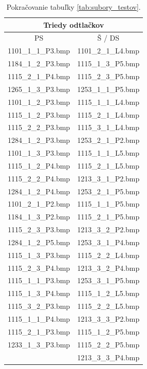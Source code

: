   \begin{table}
    \centering
    \caption{Pokračovanie tabuľky \ref{tab:subory_testov}.}
    \begin{tabular}{ | c | c | }
      \hline
      \multicolumn{2}{|c|}{Triedy odtlačkov}            \\
      \hline
      PS    & Š / DS     \\
      \hline
       1101\_1\_1\_P3.bmp & 1101\_2\_1\_L4.bmp \\
       1184\_1\_2\_P3.bmp & 1115\_1\_3\_P5.bmp \\
       1115\_2\_1\_P4.bmp & 1115\_2\_3\_P5.bmp \\
       1265\_1\_3\_P3.bmp & 1253\_1\_1\_P5.bmp \\
       1101\_1\_2\_P3.bmp & 1115\_1\_1\_L4.bmp \\
       1115\_1\_2\_P3.bmp & 1115\_2\_1\_L4.bmp \\
       1115\_2\_2\_P3.bmp & 1115\_3\_1\_L4.bmp \\
       1284\_1\_2\_P3.bmp & 1253\_2\_1\_P2.bmp \\
       1101\_1\_3\_P3.bmp & 1115\_1\_1\_L5.bmp \\
       1115\_1\_2\_P4.bmp & 1115\_2\_1\_L5.bmp \\
       1115\_2\_2\_P4.bmp & 1213\_3\_1\_P2.bmp \\
       1284\_1\_2\_P4.bmp & 1253\_2\_1\_P5.bmp \\
       1101\_2\_1\_P2.bmp & 1115\_1\_1\_P5.bmp \\
       1184\_1\_3\_P2.bmp & 1115\_2\_1\_P5.bmp \\
       1115\_2\_3\_P3.bmp & 1213\_3\_2\_P2.bmp \\
       1284\_1\_2\_P5.bmp & 1253\_3\_1\_P4.bmp \\
       1115\_1\_3\_P3.bmp & 1115\_2\_2\_L4.bmp \\
       1115\_2\_3\_P4.bmp & 1213\_3\_2\_P4.bmp \\
       1115\_1\_1\_P3.bmp & 1253\_3\_1\_P5.bmp \\
       1115\_1\_3\_P4.bmp & 1115\_1\_2\_L5.bmp \\
       1115\_3\_2\_P3.bmp & 1115\_2\_2\_L5.bmp \\
       1115\_1\_1\_P4.bmp & 1213\_3\_3\_P2.bmp \\
       1115\_2\_1\_P3.bmp & 1115\_1\_2\_P5.bmp \\
       1233\_1\_3\_P3.bmp & 1115\_2\_2\_P5.bmp \\
                          & 1213\_3\_3\_P4.bmp \\

\end{tabular}
\end{table}
